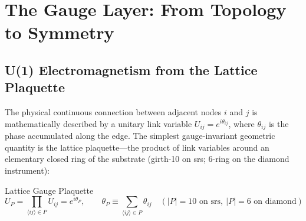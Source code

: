 
\section{The Gauge Layer: From Topology to Symmetry}

\subsection{U(1) Electromagnetism from the Lattice Plaquette}
The physical continuous connection between adjacent nodes $i$ and $j$ is mathematically described by a unitary link variable $U_{ij} = e^{i\theta_{ij}}$, where $\theta_{ij}$ is the phase accumulated along the edge. The simplest gauge-invariant geometric quantity is the lattice plaquette---the product of link variables around an elementary closed ring of the substrate (girth-10 on srs; 6-ring on the diamond instrument):
\begin{resultbox}{Lattice Gauge Plaquette}
\begin{equation}
    U_P = \prod_{\langle ij\rangle \in P} U_{ij} = e^{i\theta_P}, \qquad \theta_P \equiv \sum_{\langle ij\rangle \in P} \theta_{ij} \quad (|P|=10 \text{ on srs},\ |P|=6 \text{ on diamond})
\end{equation}
\end{resultbox}

